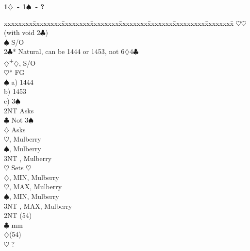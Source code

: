 \documentclass[10pt]{article}
\renewcommand{\c}{$\clubsuit$}
\renewcommand{\d}{$\diamondsuit$}
\newcommand{\h}{$\heartsuit$}
\newcommand{\s}{$\spadesuit$}
\newcommand{\p}{\textsuperscript{+}}
\newenvironment{bidtable}[1][]
{\textbf{#1}
  \begin{adjustwidth}{1em}{}
    \addvspace{2pt}
    \begin{tabbing}
      xxxxxxxx\=xxxxxxxx\=xxxxxxxx\=xxxxxxxx\=xxxxxxxx\=xxxxxxx\=xxxxxxxxx\=xxxxxxxx\=\kill}
{\end{tabbing}\end{adjustwidth}\bigskip}%
\begin{document}
\begin{bidtable}[1\d\ - 1\s\ - ?]
     \h  {}\h (with void 2\c)                                \\
     \s  \> S/O                                                \\
2\c* \> Natural, can be 1444 or 1453, not 6\d 4\c                  \\
     \d  {}\p\d, S/O                                         \\
     \h* \> FG                                                 \\
     \>      \s \> a) 1444                                     \\
     \>      \>     \> b) 1453                                     \\
     \>      \>     \> c) 3\s                                      \\
     \>      \>     \> 2NT  \> Asks                                \\
     \>      \>     \>      \c \> Not 3\s                      \\
     \>      \>     \>      \>     \d \> Asks                  \\
     \>      \>     \>      \>     \>     \h {}, Mulberry \\
     \>      \>     \>      \>     \>     \s {}, Mulberry \\
     \>      \>     \>      \>     \>     \> 3NT , Mulberry \\
     \>      \>     \>      \>     \h \> Sets \h               \\
     \>      \>     \>      \d {}, MIN, Mulberry                             \\
     \>      \>     \>      \h {}, MAX, Mulberry                             \\
     \>      \>     \>      \s {}, MIN, Mulberry                              \\
     \>      \>     \>      \> 3NT , MAX, Mulberry                              \\
     \>      \> 2NT (54)                                      \\
     \>      \c {} mm                                       \\
     \>      \d {}(54)                                        \\
     \>      \h \> ?                                           \\

\end{bidtable}
\end{document}
